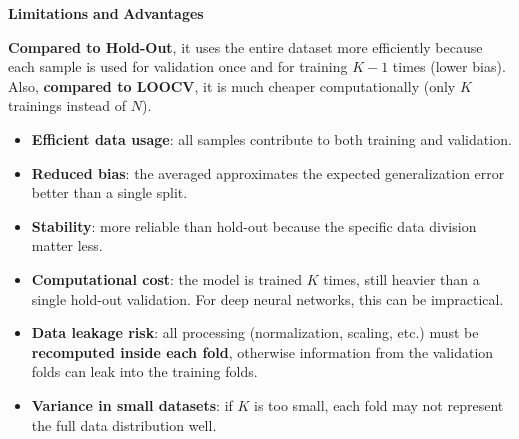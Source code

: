 \highspace
\begin{flushleft}
    \textcolor{Red2}{ \textbf{Limitations}} \textbf{and} \textcolor{Green3}{ \textbf{Advantages}}
\end{flushleft}
\textbf{Compared to Hold-Out}, it uses the entire dataset more efficiently because each sample is used for validation once and for training $K-1$ times (lower bias). Also, \textbf{compared to LOOCV}, it is much cheaper computationally (only $K$ trainings instead of $N$).
\begin{itemize}
    \item[\textcolor{Green3}{\faIcon{check}}] \textcolor{Green3}{\textbf{Efficient data usage}}: all samples contribute to both training and validation.
    \item[\textcolor{Green3}{\faIcon{check}}] \textcolor{Green3}{\textbf{Reduced bias}}: the averaged approximates the expected generalization error better than a single split.
    \item[\textcolor{Green3}{\faIcon{check}}] \textcolor{Green3}{\textbf{Stability}}: more reliable than hold-out because the specific data division matter less.
    \item[\textcolor{Red2}{\faIcon{times}}] \textcolor{Red2}{\textbf{Computational cost}}: the model is trained $K$ times, still heavier than a single hold-out validation. For deep neural networks, this can be impractical.
    \item[\textcolor{Red2}{\faIcon{times}}] \textcolor{Red2}{\textbf{Data leakage risk}}: all processing (normalization, scaling, etc.) must be \textbf{recomputed inside each fold}, otherwise information from the validation folds can leak into the training folds.
    \item[\textcolor{Red2}{\faIcon{times}}] \textcolor{Red2}{\textbf{Variance in small datasets}}: if $K$ is too small, each fold may not represent the full data distribution well. 
\end{itemize}